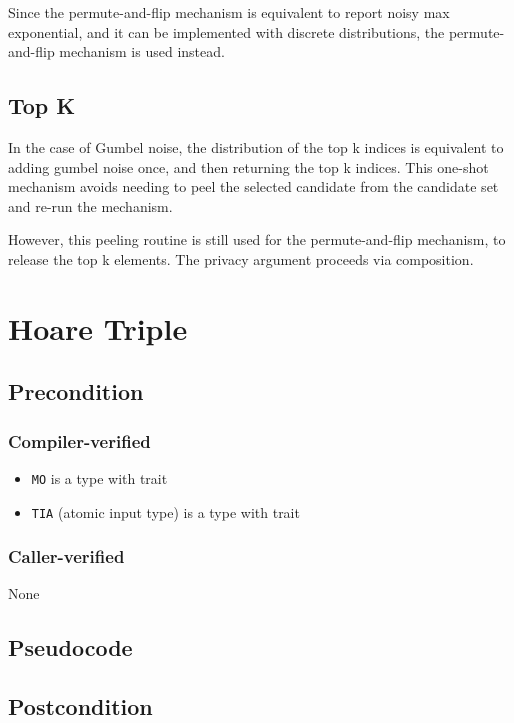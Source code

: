 \documentclass{article}
\begin{document}
Since the permute-and-flip mechanism is equivalent to report noisy max exponential,
and it can be implemented with discrete distributions,
the permute-and-flip mechanism is used instead.

\subsection{Top K} 
In the case of Gumbel noise, the distribution of the top k indices is equivalent to adding gumbel noise once,
and then returning the top k indices.
This one-shot mechanism avoids needing to peel the selected candidate from the candidate set and re-run the mechanism.

However, this peeling routine is still used for the permute-and-flip mechanism,
to release the top k elements.
The privacy argument proceeds via composition.

\section{Hoare Triple} 
\subsection*{Precondition} 
\subsubsection*{Compiler-verified}
\begin{itemize} 
    \item \texttt{MO} is a type with trait 
    \item \texttt{TIA} (atomic input type) is a type with trait 
\end{itemize} 

\subsubsection*{Caller-verified}
None
 
\subsection*{Pseudocode} 
\label{sec:python-pseudocode} 
 
 
\subsection*{Postcondition} 
 
\end{document}
